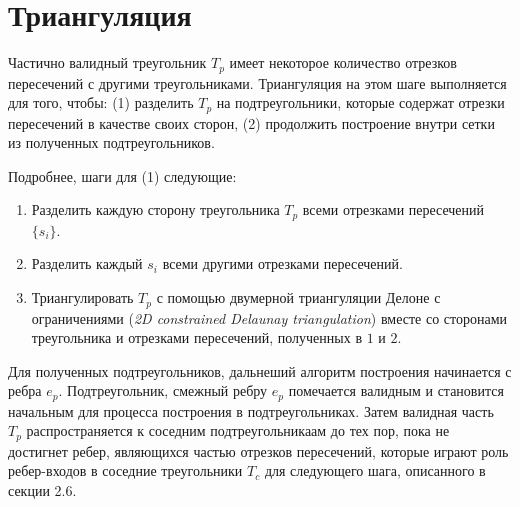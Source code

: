 \section{Триангуляция}

Частично валидный треугольник $T_p$ имеет некоторое количество отрезков пересечений с другими треугольниками. Триангуляция на этом шаге выполняется для того, чтобы: (1) разделить $T_p$ на подтреугольники, которые содержат отрезки пересечений в качестве своих сторон, (2) продолжить построение внутри сетки из полученных подтреугольников.

Подробнее, шаги для (1) следующие:

\begin{enumerate}
\item Разделить каждую сторону треугольника $T_p$ всеми отрезками пересечений $\{s_i\}$.
\item Разделить каждый $s_i$ всеми другими отрезками пересечений.
\item Триангулировать $T_p$ с помощью двумерной триангуляции Делоне с ограничениями (\textit{2D constrained Delaunay triangulation}) \cite{triangulation} вместе со сторонами треугольника и отрезками пересечений, полученных в $1$ и $2$.

\end{enumerate}
Для полученных подтреугольников, дальнеший алгоритм построения начинается с ребра $e_p$. Подтреугольник, смежный ребру $e_p$ помечается валидным и становится начальным для процесса построения в подтреугольниках. Затем валидная часть $T_p$ распространяется к соседним подтреугольникаам до тех пор, пока не достигнет ребер, являющихся частью отрезков пересечений, которые играют роль ребер-входов в соседние треугольники $T_c$ для следующего шага, описанного в секции 2.6.



